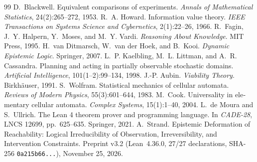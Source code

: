 \documentclass[10pt,a4paper]{article}
\begin{document}
\begin{otherlanguage}{english}
\begin{thebibliography}{99}
\small
{} D.~Blackwell. Equivalent comparisons of experiments. \emph{Annals of Mathematical Statistics}, 24(2):265--272, 1953.
 R.~A. Howard. Information value theory. \emph{IEEE Transactions on Systems Science and Cybernetics}, 2(1):22--26, 1966.
 R.~Fagin, J.~Y. Halpern, Y.~Moses, and M.~Y. Vardi. \emph{Reasoning About Knowledge}. MIT Press, 1995.
 H.~van Ditmarsch, W.~van der Hoek, and B.~Kooi. \emph{Dynamic Epistemic Logic}. Springer, 2007.
 L.~P. Kaelbling, M.~L. Littman, and A.~R. Cassandra. Planning and acting in partially observable stochastic domains. \emph{Artificial Intelligence}, 101(1--2):99--134, 1998.
 J.-P. Aubin. \emph{Viability Theory}. Birkh\"auser, 1991.
 S.~Wolfram. Statistical mechanics of cellular automata. \emph{Reviews of Modern Physics}, 55(3):601--644, 1983.
 M.~Cook. Universality in elementary cellular automata. \emph{Complex Systems}, 15(1):1--40, 2004.
 L.~de Moura and S.~Ullrich. The Lean 4 theorem prover and programming language. In \emph{CADE-28}, LNCS 12699, pp.~625--635. Springer, 2021.
 A.~Strand. Epistemic Deformation of Reachability: Logical Irreducibility of Observation, Irreversibility, and Intervention Constraints. Preprint v3.2 (Lean~4.36.0, 27/27 declarations, SHA-256 \nolinkurl{0a215b66...}), November 25, 2026.
\end{thebibliography}
\end{otherlanguage}
\end{document}
